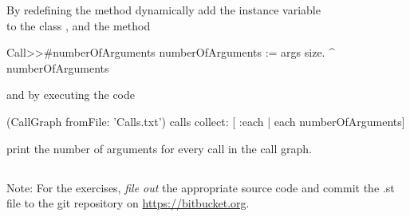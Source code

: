 \documentclass [11pt, a4wide, twoside]{article}
\begin{document}
By redefining the method  dynamically add the instance variable \\  to the class , and the method
\begin{code}
Call>>#numberOfArguments
	numberOfArguments := args size.
	^ numberOfArguments
\end{code}
 and by executing the code
\begin{code}
(CallGraph fromFile: 'Calls.txt') calls collect: [ :each | each numberOfArguments] 
\end{code}
print the number of arguments for every call in the call graph.


\subsection*{}
Note: For the exercises, {\em file out} the appropriate source code and commit the .st file to the git repository on \href{https://bitbucket.org}{https://bitbucket.org}.
\end{document}
